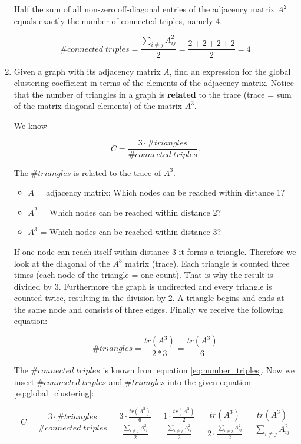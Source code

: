 \begin{enumerate}
	Half the sum of all non-zero off-diagonal entries of the adjacency matrix $A^2$ equals exactly the number of connected triples, namely 4.
	
	\begin{equation} \label{eq:number_triples}
		\#connected \; triples = \frac{\sum_{i \neq j} A^2_{ij}}{2} = \frac{2+2+2+2}{2} = 4 
	\end{equation}
	
	\item Given a graph with its adjacency matrix $A$, find an expression for the global clustering coefficient in terms of the elements of the adjacency matrix. Notice that the number of triangles in a graph is \textbf{related} to the trace (trace = sum of the matrix diagonal elements) of the matrix $A^3$.
	
	We know 
	
	\begin{equation} \label{eq:global_clustering}
		C = \frac{3 \cdot \#triangles}{\#connected \; triples}.
	\end{equation}
	
	The $\#triangles$ is related to the trace of $A^3$.
	\begin{itemize}
		\item $A$ = adjacency matrix: Which nodes can be reached within distance 1?
	 	\item $A^2$ = Which nodes can be reached within distance 2?
	 	\item $A^3$ = Which nodes can be reached within distance 3?
	\end{itemize}
 	
 	If one node can reach itself within distance 3 it forms a triangle. Therefore we look at the diagonal of the $A^3$ matrix (trace). Each triangle is counted three times (each node of the triangle = one count). That is why the result is divided by 3. Furthermore the graph is undirected and every triangle is counted twice, resulting in the division by 2.
 	A triangle begins and ends at the same node and consists of three edges. Finally we receive the following equation:
 	
 	\begin{equation}
 		\#triangles = \frac{tr(A^3)}{2 * 3} = \frac{tr(A^3)}{6}
 	\end{equation}
	
	The $\#connected \; triples$ is known from equation \ref{eq:number_triples}. Now we insert $\#connected \; triples$ and $\#triangles$ into the given equation \ref{eq:global_clustering}:
	
	\begin{equation*}
		C = \frac{3 \cdot \#triangles}{\#connected \; triples}
		= \frac{3 \cdot \frac{tr(A^3)}{6}}{\frac{\sum_{i \neq j} A^2_{ij}}{2}} 
		= \frac{1 \cdot \frac{tr(A^3)}{2}}{\frac{\sum_{i \neq j} A^2_{ij}}{2}} 
		= \frac{tr(A^3)}{2 \cdot \frac{\sum_{i \neq j} A^2_{ij}}{2}}
		= \frac{tr(A^3)}{\sum_{i \neq j} A^2_{ij}}
	\end{equation*}

\end{enumerate}
